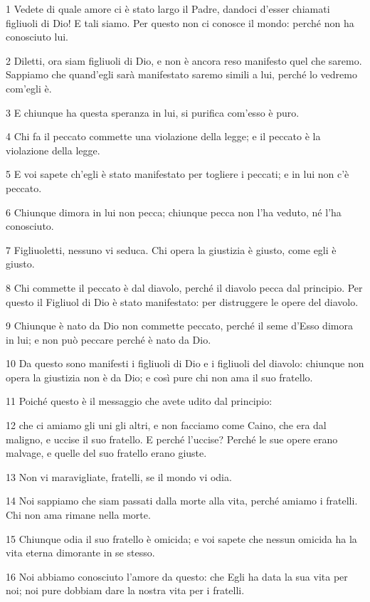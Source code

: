\par 1 Vedete di quale amore ci è stato largo il Padre, dandoci d'esser chiamati figliuoli di Dio! E tali siamo. Per questo non ci conosce il mondo: perché non ha conosciuto lui.
\par 2 Diletti, ora siam figliuoli di Dio, e non è ancora reso manifesto quel che saremo. Sappiamo che quand'egli sarà manifestato saremo simili a lui, perché lo vedremo com'egli è.
\par 3 E chiunque ha questa speranza in lui, si purifica com'esso è puro.
\par 4 Chi fa il peccato commette una violazione della legge; e il peccato è la violazione della legge.
\par 5 E voi sapete ch'egli è stato manifestato per togliere i peccati; e in lui non c'è peccato.
\par 6 Chiunque dimora in lui non pecca; chiunque pecca non l'ha veduto, né l'ha conosciuto.
\par 7 Figliuoletti, nessuno vi seduca. Chi opera la giustizia è giusto, come egli è giusto.
\par 8 Chi commette il peccato è dal diavolo, perché il diavolo pecca dal principio. Per questo il Figliuol di Dio è stato manifestato: per distruggere le opere del diavolo.
\par 9 Chiunque è nato da Dio non commette peccato, perché il seme d'Esso dimora in lui; e non può peccare perché è nato da Dio.
\par 10 Da questo sono manifesti i figliuoli di Dio e i figliuoli del diavolo: chiunque non opera la giustizia non è da Dio; e così pure chi non ama il suo fratello.
\par 11 Poiché questo è il messaggio che avete udito dal principio:
\par 12 che ci amiamo gli uni gli altri, e non facciamo come Caino, che era dal maligno, e uccise il suo fratello. E perché l'uccise? Perché le sue opere erano malvage, e quelle del suo fratello erano giuste.
\par 13 Non vi maravigliate, fratelli, se il mondo vi odia.
\par 14 Noi sappiamo che siam passati dalla morte alla vita, perché amiamo i fratelli. Chi non ama rimane nella morte.
\par 15 Chiunque odia il suo fratello è omicida; e voi sapete che nessun omicida ha la vita eterna dimorante in se stesso.
\par 16 Noi abbiamo conosciuto l'amore da questo: che Egli ha data la sua vita per noi; noi pure dobbiam dare la nostra vita per i fratelli.
